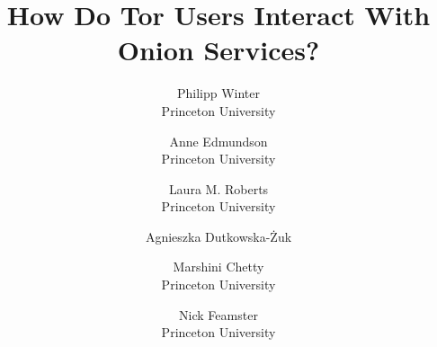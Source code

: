 \documentclass[letterpaper,twocolumn,10pt]{article}
\begin{document}
\date{}

\title{
    {\Large \textbf{How Do Tor Users Interact With Onion Services?}}
}

\author{
	{\rm \phantom{ZZZZ}Philipp Winter\phantom{ZZZZ}} \\
	Princeton University
	\and
	{\rm \phantom{ZZZZ}Anne Edmundson\phantom{ZZZZ}} \\
	Princeton University
	\and
	{\rm \phantom{ZZZ}Laura M. Roberts\phantom{ZZZ}} \\
	Princeton University
	\and
	{\rm Agnieszka Dutkowska-Żuk} \\
        \phantom{Princeton University}
	\and
	{\rm \phantom{ZZZZ}Marshini Chetty\phantom{ZZZZ}} \\
	Princeton University
	\and
	{\rm \phantom{ZZZZ}Nick Feamster\phantom{ZZZZ}} \\
	Princeton University
}

\maketitle

\thispagestyle{empty}



















{\footnotesize
\printbibliography}
\end{document}
